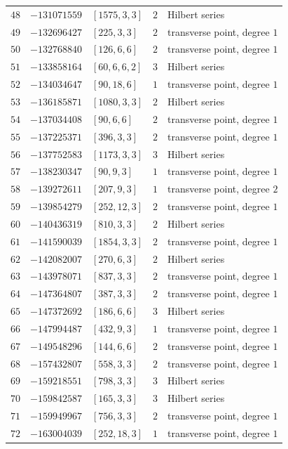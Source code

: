 \documentclass[11pt]{article}
\begin{document}
\begin{center}
\begin{longtable}{r r l c l}
$48$ & $-131071559$ & $[1575,3,3]$ & $2$ & Hilbert series\\
$49$ & $-132696427$ & $[225,3,3]$ & $2$ & transverse point, degree $1$\\
$50$ & $-132768840$ & $[126,6,6]$ & $2$ & transverse point, degree $1$\\
$51$ & $-133858164$ & $[60,6,6,2]$ & $3$ & Hilbert series\\
$52$ & $-134034647$ & $[90,18,6]$ & $1$ & transverse point, degree $1$\\
$53$ & $-136185871$ & $[1080,3,3]$ & $2$ & Hilbert series\\
$54$ & $-137034408$ & $[90,6,6]$ & $2$ & transverse point, degree $1$\\
$55$ & $-137225371$ & $[396,3,3]$ & $2$ & transverse point, degree $1$\\
$56$ & $-137752583$ & $[1173,3,3]$ & $3$ & Hilbert series\\
$57$ & $-138230347$ & $[90,9,3]$ & $1$ & transverse point, degree $1$\\
$58$ & $-139272611$ & $[207,9,3]$ & $1$ & transverse point, degree $2$\\
$59$ & $-139854279$ & $[252,12,3]$ & $2$ & transverse point, degree $1$\\
$60$ & $-140436319$ & $[810,3,3]$ & $2$ & Hilbert series\\
$61$ & $-141590039$ & $[1854,3,3]$ & $2$ & transverse point, degree $1$\\
$62$ & $-142082007$ & $[270,6,3]$ & $2$ & Hilbert series\\
$63$ & $-143978071$ & $[837,3,3]$ & $2$ & transverse point, degree $1$\\
$64$ & $-147364807$ & $[387,3,3]$ & $2$ & transverse point, degree $1$\\
$65$ & $-147372692$ & $[186,6,6]$ & $3$ & Hilbert series\\
$66$ & $-147994487$ & $[432,9,3]$ & $1$ & transverse point, degree $1$\\
$67$ & $-149548296$ & $[144,6,6]$ & $2$ & transverse point, degree $1$\\
$68$ & $-157432807$ & $[558,3,3]$ & $2$ & transverse point, degree $1$\\
$69$ & $-159218551$ & $[798,3,3]$ & $3$ & Hilbert series\\
$70$ & $-159842587$ & $[165,3,3]$ & $3$ & Hilbert series\\
$71$ & $-159949967$ & $[756,3,3]$ & $2$ & transverse point, degree $1$\\
$72$ & $-163004039$ & $[252,18,3]$ & $1$ & transverse point, degree $1$\\

\end{longtable}
\end{center}
\end{document}
